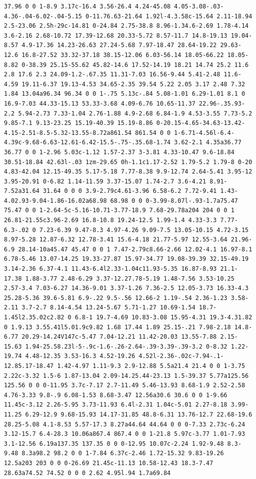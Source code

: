 \documentclass[11pt]{article}
\begin{document}
\begin{enumerate}
\begin{verbatim}
37.96 0 0 1-8.9 3.17c-16.4 3.56-26.4 4.24-45.08 4.05-3.08-.03-4.36-.04-6.02-.04-5.15 0-11.76.63-21.64 1.92l-4.3.58c-15.64 2.11-18.94 2.5-23.06 2.5h-29c-14.81 0-24.84 2.75-38.8 8.96-1.34.6-2.69 1.78-4.14 3.6-2.16 2.68-10.72 17.39-12.68 20.33-5.72 8.57-11.7 14.8-19.13 19.04-8.57 4.9-17.36 14.23-26.63 27.24-5.68 7.97-18.47 28.64-19.22 29.63-12.6 16.8-27.52 33.32-37.18 38.15-12.06 6.03-56.14 18.05-66.22 18.05-8.82 0-38.39 25.15-55.62 45.82-14.6 17.52-14.19 18.21 14.74 25.2 11.6 2.8 17.6 2.3 24.09-1.2-.67.35 11.31-7.03 16.56-9.44 5.41-2.48 11.6-4.59 19.11-6.37 19.13-4.53 34.65-2.35 39.54 5.22 2.05 3.17 2.48 7.32 1.84 13.04a96.34 96.34 0 0 1-.75 5.13c-.84 5.08-1.01 6.29-1.01 8.1 0 16.9-7.03 44.33-15.13 53.33-3.68 4.09-6.76 10.65-11.37 22.96-.35.93-2.2 5.94-2.73 7.33-1.04 2.76-1.88 4.9-2.68 6.84-1.9 4.53-3.55 7.73-5.2 9.85-7.1 9.13-23.25 15.19-40.39 15.19-8.86 0-20.15-4.65-34.63-13.42-4.15-2.51-8.5-5.32-13.55-8.72a861.54 861.54 0 0 1-6.71-4.56l-6.4-4.39c-9.68-6.63-12.61-6.42-15.5-.75-.35.68-1.74 3.62-2.1 4.35a36.77 36.77 0 0 1-2.96 5.03c-1.12 1.57-2.37 3-3.81 4.33-10.47 9.6-18.84 30.51-18.84 42.63l-.03 1zm-29.65 0h-1.1c1.17-2.52 1.79-5.2 1.79-8 0-20 4.83-42.04 12.15-49.35 5.17-5.18 7.77-8.38 9.9-12.74 2.64-5.41 3.95-12 3.95-20.91 0-6.82 1.14-11.59 3.37-15.07 1.74-2.7 3.6-4.21 8.91-7.52a31.64 31.64 0 0 0 3.9-2.79c4.61-3.96 6.58-6.2 7.72-9.41 1.43-4.02.93-9.04-1.86-16.02a68.98 68.98 0 0 0-3.99-8.07l-.93-1.7a75.47 75.47 0 0 1-2.64-5c-5.16-10.71-3.77-18.9 7.68-29.78a204 204 0 0 1 26.81-21.55c3.96-2.69 16.8-10.8 19.24-12.5 1.99-1.4 4.33-3.3 7.77-6.3-.02 0 7.23-6.39 9.47-8.3 4.97-4.26 9.09-7.5 13.05-10.15 4.72-3.15 8.97-5.28 12.87-6.32 12.78-3.41 15.6-4.18 21.77-5.97 12.55-3.64 21.96-6.9 28.14-10a45.47 45.47 0 0 1 7.47-2.79c8.66-2.66 12.02-4.1 16.97-8.1 6.78-5.46 13.07-14.25 19.33-27.87 15.97-34.77 19.08-39.39 32.15-49.19 3.14-2.36 6.37-4.1 11.43-6.4l2.33-1.04c11.93-5.35 16.87-8.93 21.1-17.38 1.88-3.77 2.48-6.29 3.37-12.27.78-5.19 1.48-7.56 3.53-10.25 2.57-3.4 7.03-6.27 14.36-9.01 3.37-1.26 7.36-2.5 12.05-3.73 16.33-4.3 25.28-5.36 39.6-5.81 6.9-.22 9.5-.56 12.66-2 1.19-.54 2.36-1.23 3.58-2.11 3.7-2.7 8.14-4.54 13.24-5.67 5.71-1.27 10.69-1.54 18.7-1.45l2.35.02c2.82 0 6.8-1 19.7-4.69 10.83-3.08 15.95-4.31 19.3-4.31.82 0 1.9.13 3.55.41l5.01.9c9.82 1.68 17.44 1.89 25.15-.21 7.98-2.18 14.8-6.77 20.29-14.24V147c-5.47 7.04-12.21 11.42-20.03 13.55-7.88 2.15-15.63 1.94-25.58.23l-5-.9c-1.6-.26-2.64-.39-3.39-.39-3.2 0-8.32 1.22-19.74 4.48-12.35 3.53-16.3 4.52-19.26 4.52l-2.36-.02c-7.94-.1-12.85.17-18.47 1.42-4.97 1.11-9.3 2.9-12.88 5.5a21.4 21.4 0 0 1-3.75 2.22c-3.32 1.5-6 1.87-13.04 2.09-14.25.44-23.13 1.5-39.37 5.77a125.56 125.56 0 0 0-11.95 3.7c-7.17 2.7-11.49 5.46-13.93 8.68-1.9 2.52-2.58 4.76-3.33 9.8-.9 6.08-1.53 8.68-3.47 12.56a30.6 30.6 0 0 1-9.66 11.45c-3.12 2.26-5.95 3.73-11.93 6.4l-2.31 1.04c-5.01 2.27-8.18 3.99-11.25 6.29-12.9 9.68-15.93 14.17-31.85 48.8-6.31 13.76-12.7 22.68-19.6 28.25-5.08 4.1-8.53 5.57-17.3 8.27a44.64 44.64 0 0 0-7.33 2.73c-6.24 3.12-15.7 6.4-28.3 10.06a867.4 867.4 0 0 1-21.8 5.97c-3.77 1.01-7.93 3.1-12.56 6.19a137.35 137.35 0 0 0-12.95 10.07c-2.24 1.92-9.48 8.3-9.48 8.3a98.2 98.2 0 0 1-7.84 6.37c-2.46 1.72-15.32 9.83-19.26 12.5a203 203 0 0 0-26.69 21.45c-11.13 10.58-12.43 18.3-7.47 28.63a74.52 74.52 0 0 0 2.62 4.95l.94 1.7a69.84 
\end{verbatim}
\end{enumerate}
\end{document}
